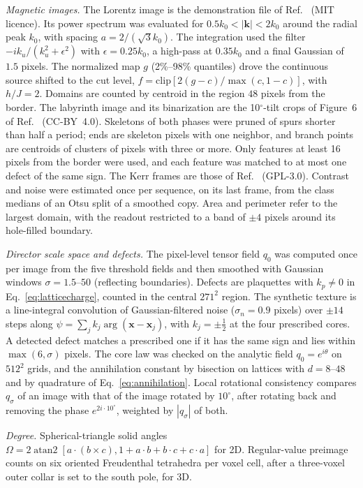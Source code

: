 \documentclass[11pt,a4paper]{article}
\begin{document}
\emph{Magnetic images.} The Lorentz image is the demonstration file of Ref.~\cite{McCray2024} (MIT licence). Its power spectrum was evaluated for $0.5k_0<|\bm k|<2k_0$ around the radial peak $k_0$, with spacing $a=2/(\sqrt3k_0)$. The integration used the filter $-ik_u/(k_u^2+\epsilon^2)$ with $\epsilon=0.25k_0$, a high-pass at $0.35k_0$ and a final Gaussian of $1.5$ pixels. The normalized map $g$ (2\%--98\% quantiles) drove the continuous source shifted to the cut level, $f=\mathrm{clip}[2(g-c)/\max(c,1-c)]$, with $h/J=2$. Domains are counted by centroid in the region $48$ pixels from the border. The labyrinth image and its binarization are the 10$^\circ$-tilt crops of Figure~6 of Ref.~\cite{Zhao2026} (CC-BY~4.0). Skeletons of both phases were pruned of spurs shorter than half a period; ends are skeleton pixels with one neighbor, and branch points are centroids of clusters of pixels with three or more. Only features at least 16 pixels from the border were used, and each feature was matched to at most one defect of the same sign. The Kerr frames are those of Ref.~\cite{KerrPy} (GPL-3.0). Contrast and noise were estimated once per sequence, on its last frame, from the class medians of an Otsu split of a smoothed copy. Area and perimeter refer to the largest domain, with the readout restricted to a band of $\pm4$ pixels around its hole-filled boundary.

\emph{Director scale space and defects.} The pixel-level tensor field $q_0$ was computed once per image from the five threshold fields and then smoothed with Gaussian windows $\sigma=1.5$--$50$ (reflecting boundaries). Defects are plaquettes with $k_p\neq0$ in Eq.~\eqref{eq:latticecharge}, counted in the central $271^2$ region. The synthetic texture is a line-integral convolution of Gaussian-filtered noise ($\sigma_n=0.9$ pixels) over $\pm14$ steps along $\psi=\sum_jk_j\arg(\bm x-\bm x_j)$, with $k_j=\pm\tfrac12$ at the four prescribed cores. A detected defect matches a prescribed one if it has the same sign and lies within $\max(6,\sigma)$ pixels. The core law was checked on the analytic field $q_0=e^{i\theta}$ on $512^2$ grids, and the annihilation constant by bisection on lattices with $d=8$--$48$ and by quadrature of Eq.~\eqref{eq:annihilation}. Local rotational consistency compares $q_\sigma$ of an image with that of the image rotated by $10^\circ$, after rotating back and removing the phase $e^{2i\cdot10^\circ}$, weighted by $|q_\sigma|$ of both.

\emph{Degree.} Spherical-triangle solid angles $\Omega=2\operatorname{atan2}[a\cdot(b\times c),1+a\cdot b+b\cdot c+c\cdot a]$ for 2D. Regular-value preimage counts on six oriented Freudenthal tetrahedra per voxel cell, after a three-voxel outer collar is set to the south pole, for 3D.
\end{document}
